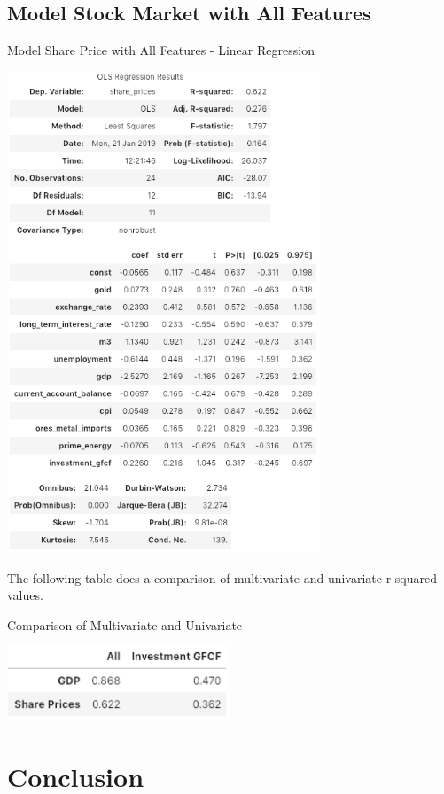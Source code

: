 \documentclass{elsarticle}
\begin{document}
\subsection{Model Stock Market with All Features}
\begin{table}[H]
  \centering
  \caption{Model Share Price with All Features - Linear Regression}
  \includegraphics[width=0.7\textwidth]{images/ols_4.png}
\end{table}

The following table does a comparison of multivariate and univariate r-squared values.
\begin{table}[H]
  \centering
  \caption{Comparison of Multivariate and Univariate}
  \includegraphics[width=0.5\textwidth]{images/r_square.png}
\end{table}

\section{Conclusion}
\end{document}
